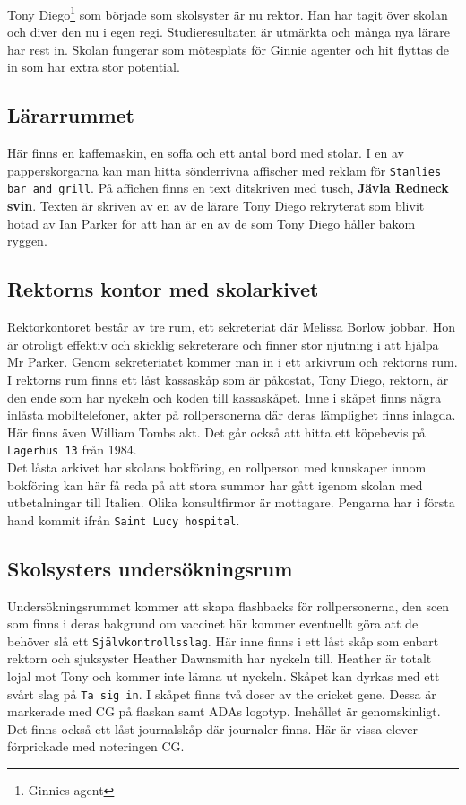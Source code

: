 \documentclass[a5paper,10pt]{report}
\begin{document}
Tony Diego\footnote{Ginnies agent} som började som skolsyster är nu rektor. Han har tagit över skolan och diver den nu i egen regi. Studieresultaten är utmärkta och många nya lärare har rest in. Skolan fungerar som mötesplats för Ginnie agenter och hit flyttas de in som har extra stor potential.
\subsection{Lärarrummet}
Här finns en kaffemaskin, en soffa och ett antal bord med stolar. I en av papperskorgarna kan man hitta sönderrivna affischer med reklam för \texttt{Stanlies bar and grill}. På affichen finns en text ditskriven med tusch, \textbf{Jävla Redneck svin}. Texten är skriven av en av de lärare Tony Diego rekryterat som blivit hotad av Ian Parker för att han är en av de som Tony Diego håller bakom ryggen.
\subsection{Rektorns kontor med skolarkivet}
Rektorkontoret består av tre rum, ett sekreteriat där Melissa Borlow jobbar. Hon är otroligt effektiv och skicklig sekreterare och finner stor njutning i att hjälpa Mr Parker. Genom sekreteriatet kommer man in i ett arkivrum och rektorns rum.\\

I rektorns rum finns ett låst kassaskåp som är påkostat, Tony Diego, rektorn, är den ende som har nyckeln och koden till kassaskåpet. Inne i skåpet finns några inlåsta mobiltelefoner, akter på rollpersonerna där deras lämplighet finns inlagda. Här finns även William Tombs akt. Det går också att hitta ett köpebevis på \texttt{Lagerhus 13} från 1984.\\

Det låsta arkivet har skolans bokföring, en rollperson med kunskaper innom bokföring kan här få reda på att stora summor har gått igenom skolan med utbetalningar till Italien. Olika konsultfirmor är mottagare. Pengarna har i första hand kommit ifrån \texttt{Saint Lucy hospital}.\\

\subsection{Skolsysters undersökningsrum}
Undersökningsrummet kommer att skapa flashbacks för rollpersonerna, den scen som finns i deras bakgrund om vaccinet här kommer eventuellt göra att de behöver slå ett \texttt{Självkontrollsslag}. Här inne finns i ett låst skåp som enbart rektorn och sjuksyster Heather Dawnsmith har nyckeln till. Heather är totalt lojal mot Tony och kommer inte lämna ut nyckeln. Skåpet kan dyrkas med ett svårt slag på \texttt{Ta sig in}. I skåpet finns två doser av the cricket gene. Dessa är markerade med CG på flaskan samt ADAs logotyp. Inehållet är genomskinligt. Det finns också ett låst journalskåp där journaler finns. Här är vissa elever förprickade med noteringen CG.
\end{document}
